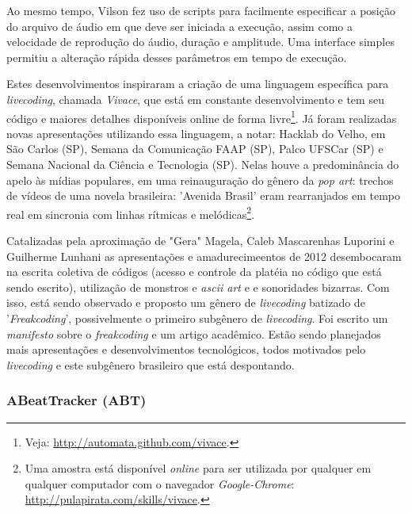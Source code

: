 Ao mesmo tempo, Vilson fez uso de scripts para
facilmente especificar a posição do arquivo de
áudio em que deve ser iniciada a execução, assim como a velocidade de
reprodução do áudio, duração e
amplitude. Uma interface simples permitiu a
alteração rápida desses parâmetros em tempo de execução.



Estes desenvolvimentos inspiraram a criação de uma linguagem
específica para \emph{livecoding}, chamada \emph{Vivace}, que está em constante
desenvolvimento e tem seu código e maiores detalhes disponíveis online
de forma livre\footnote{Veja: 
\url{http://automata.github.com/vivace}.}. Já foram realizadas novas
apresentações utilizando essa linguagem, a notar: Hacklab do Velho, em
São Carlos (SP), Semana da Comunicação FAAP (SP), Palco UFSCar (SP) e
Semana Nacional da Ciência e Tecnologia (SP). Nelas houve a
predominância do apelo às mídias populares, em uma reinauguração do
gênero da \emph{pop art}: trechos de vídeos de uma novela brasileira: 'Avenida Brasil'
eram rearranjados em tempo real em sincronia com linhas rítmicas e
melódicas\footnote{Uma
  amostra está disponível \emph{online} para ser utilizada por qualquer
  em qualquer computador com o navegador \emph{Google-Chrome}:
  \url{http://pulapirata.com/skills/vivace}.}.

  Catalizadas pela aproximação de "Gera" Magela, Caleb Mascarenhas Luporini e Guilherme Lunhani as
   apresentações e amadurecimeentos de 2012 desembocaram na
  escrita coletiva de códigos (acesso e controle da platéia 
  no código que está sendo escrito), utilização de monstros e \emph{ascii art} e
  e sonoridades bizarras. Com isso, está sendo observado e proposto
  um gênero de \emph{livecoding} batizado de '\emph{Freakcoding}', possivelmente o primeiro subgênero
  de \emph{livecoding}. Foi escrito um \emph{manifesto} sobre o \emph{freakcoding} e um artigo acadêmico. Estão sendo planejados mais apresentações e desenvolvimentos tecnológicos, todos motivados pelo \emph{livecoding} e este subgênero brasileiro que está despontando.
  \vspace{10mm}
\subsubsection{ABeatTracker (ABT)}

